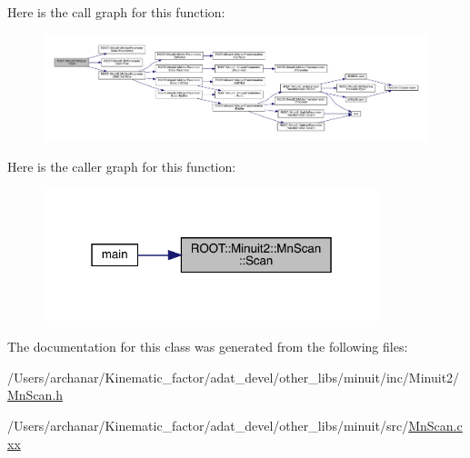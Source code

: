 Here is the call graph for this function\+:\nopagebreak
\begin{figure}[H]
\begin{center}
\leavevmode
\includegraphics[width=350pt]{de/dd8/classROOT_1_1Minuit2_1_1MnScan_ae488bb0cc7b7127847fdccdadced3ced_cgraph}
\end{center}
\end{figure}
Here is the caller graph for this function\+:\nopagebreak
\begin{figure}[H]
\begin{center}
\leavevmode
\includegraphics[width=277pt]{de/dd8/classROOT_1_1Minuit2_1_1MnScan_ae488bb0cc7b7127847fdccdadced3ced_icgraph}
\end{center}
\end{figure}


The documentation for this class was generated from the following files\+:\begin{DoxyCompactItemize}
\item 
/\+Users/archanar/\+Kinematic\+\_\+factor/adat\+\_\+devel/other\+\_\+libs/minuit/inc/\+Minuit2/\mbox{\hyperlink{other__libs_2minuit_2inc_2Minuit2_2MnScan_8h}{Mn\+Scan.\+h}}\item 
/\+Users/archanar/\+Kinematic\+\_\+factor/adat\+\_\+devel/other\+\_\+libs/minuit/src/\mbox{\hyperlink{MnScan_8cxx}{Mn\+Scan.\+cxx}}\end{DoxyCompactItemize}
